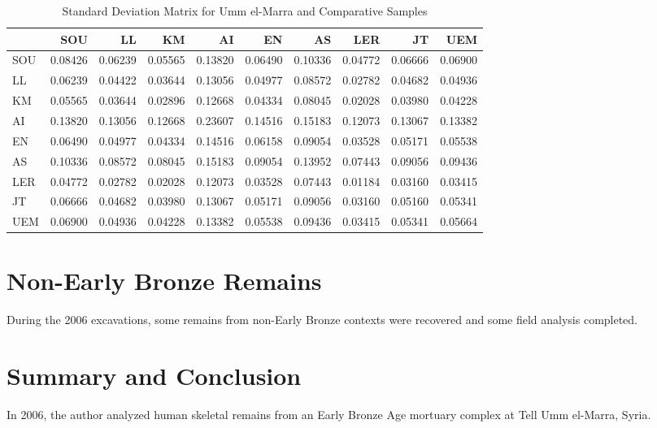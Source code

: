 \documentclass[]{book}
\begin{document}
\begin{table}

\caption{\label{tab:unnamed-chunk-5}Standard Deviation Matrix for Umm el-Marra and Comparative Samples}
\centering
\begin{tabular}[t]{l|r|r|r|r|r|r|r|r|r}
\hline
  & SOU & LL & KM & AI & EN & AS & LER & JT & UEM\\
\hline
SOU & 0.08426 & 0.06239 & 0.05565 & 0.13820 & 0.06490 & 0.10336 & 0.04772 & 0.06666 & 0.06900\\
\hline
LL & 0.06239 & 0.04422 & 0.03644 & 0.13056 & 0.04977 & 0.08572 & 0.02782 & 0.04682 & 0.04936\\
\hline
KM & 0.05565 & 0.03644 & 0.02896 & 0.12668 & 0.04334 & 0.08045 & 0.02028 & 0.03980 & 0.04228\\
\hline
AI & 0.13820 & 0.13056 & 0.12668 & 0.23607 & 0.14516 & 0.15183 & 0.12073 & 0.13067 & 0.13382\\
\hline
EN & 0.06490 & 0.04977 & 0.04334 & 0.14516 & 0.06158 & 0.09054 & 0.03528 & 0.05171 & 0.05538\\
\hline
AS & 0.10336 & 0.08572 & 0.08045 & 0.15183 & 0.09054 & 0.13952 & 0.07443 & 0.09056 & 0.09436\\
\hline
LER & 0.04772 & 0.02782 & 0.02028 & 0.12073 & 0.03528 & 0.07443 & 0.01184 & 0.03160 & 0.03415\\
\hline
JT & 0.06666 & 0.04682 & 0.03980 & 0.13067 & 0.05171 & 0.09056 & 0.03160 & 0.05160 & 0.05341\\
\hline
UEM & 0.06900 & 0.04936 & 0.04228 & 0.13382 & 0.05538 & 0.09436 & 0.03415 & 0.05341 & 0.05664\\
\hline
\end{tabular}
\end{table}

\chapter{Non-Early Bronze Remains}\label{non-early-bronze-remains}

During the 2006 excavations, some remains from non-Early Bronze contexts
were recovered and some field analysis completed.

\chapter{Summary and Conclusion}\label{summary}

In 2006, the author analyzed human skeletal remains from an Early Bronze
Age mortuary complex at Tell Umm el-Marra, Syria.


\end{document}
